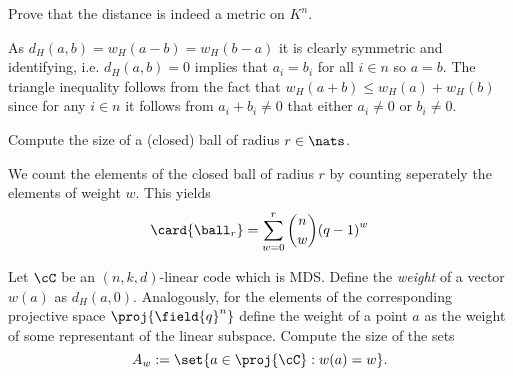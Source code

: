 
\begin{exercise}
    Prove that the  distance is indeed a metric on $K^n$.
\end{exercise}

\begin{solution}
    As $d_H(a,b)=w_H(a-b)=w_H(b-a)$ it is clearly symmetric and identifying, i.e. $d_H(a,b)=0$ implies that $a_i=b_i$ for all $i\in n$ so $a=b$.
    The triangle inequality follows from the fact that $w_H(a+b)\leq w_H(a)+w_H(b)$ since for any $i\in n$ it follows from $a_i+b_i\neq 0$ that either $a_i\neq 0$ or $b_i\neq 0$.    
\end{solution}

\begin{exercise}
    Compute the size of a (closed)  ball of radius $r\in\nats$.
\end{exercise}

\begin{solution}
    We count the elements of the closed ball of radius $r$ by counting seperately the elements of weight $w$.
    This yields
    $$
    \card{\ball_r}=\sum_{w=0}^r{\binom{n}{w}{(q-1)}^w}
    $$
\end{solution}

\begin{exercise}
    Let $\cC$ be an $(n,k,d)$-linear code which is MDS. Define the \emph{weight} of a vector $w(a)$ as $d_H(a,0)$. Analogously, for the elements of the corresponding projective space $\proj{\field{q}^n}$ define the weight of a point $a$ as the weight of some  representant of the linear subspace.
    Compute the size of the sets
    $$
    A_w:=\set{a\in\proj{\cC}:w(a)=w}.
    $$
\end{exercise}

